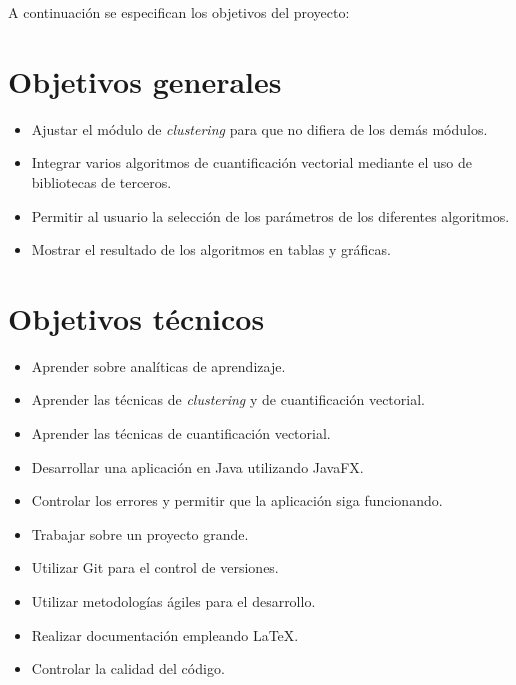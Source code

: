 
A continuación se especifican los objetivos del proyecto:

\section{Objetivos generales}
\begin{itemize}
    \item Ajustar el módulo de \emph{clustering} para que no difiera de los demás módulos.
	\item Integrar varios algoritmos de cuantificación vectorial mediante el uso de bibliotecas de terceros.
	\item Permitir al usuario la selección de los parámetros de los diferentes algoritmos.
	\item Mostrar el resultado de los algoritmos en tablas y gráficas.
\end{itemize}

\section{Objetivos técnicos}
\begin{itemize}
	\item Aprender sobre analíticas de aprendizaje.
	\item Aprender las técnicas de \emph{clustering} y de cuantificación vectorial.
	\item Aprender las técnicas de cuantificación vectorial. 
	\item Desarrollar una aplicación en Java utilizando JavaFX.
    \item Controlar los errores y permitir que la aplicación siga funcionando.
    \item Trabajar sobre un proyecto grande.
	\item Utilizar Git para el control de versiones.
    \item Utilizar metodologías ágiles para el desarrollo.
	\item Realizar documentación empleando \LaTeX.
    \item Controlar la calidad del código.
\end{itemize}